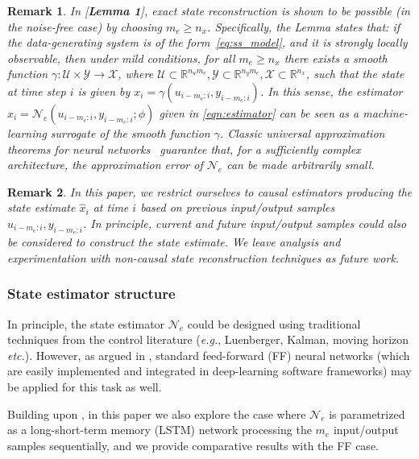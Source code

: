 \documentclass{article}
\newcommand{\NN}{\mathcal{N}} %
\newcommand{\seqlen}{m}
\newcommand{\nin}{{n_u}}
\newcommand{\ny}{{n_y}}
\newcommand{\nx}{{n_x}}
\newtheorem{remark}{Remark}
\begin{document}
\begin{remark} \label{rem:min_seq_est_len_1}
In \cite{verdult2004least}[\textbf{Lemma 1}], exact state reconstruction is shown to be possible (in the noise-free case) by choosing $\seqlen_e \geq \nx$.  Specifically, the Lemma states that: if the data-generating system is of the form~\eqref{eq:ss_model}, and it  is strongly locally observable, then under mild conditions, for all $\seqlen_e \geq \nx$ there exists a smooth function $\gamma: \mathcal{U} \times \mathcal{Y} \rightarrow \mathcal{X}$, where $\mathcal{U} \subset \mathbb{R}^{\nin \seqlen_e},  \mathcal{Y} \subset \mathbb{R}^{\ny \seqlen_e},  \mathcal{X} \subset \mathbb{R}^{\nx}$,  such that the state at time step $i$ is given by $ x_{i} = \gamma(u_{i-\seqlen_e:i}, y_{i-\seqlen_e:i})$. 
In this sense, the estimator  $x_{i} = \NN_e(u_{i-\seqlen_e:i}, y_{i-\seqlen_e:i}; \phi)$ given in \eqref{eqn:estimator} can be seen as a machine-learning surrogate of the smooth function
$\gamma$. Classic universal approximation theorems for neural networks~\cite{cybenko1989approximation} 
guarantee that, for a sufficiently complex architecture, the 
approximation error of $\NN_e$ can be made arbitrarily small.
\end{remark}

\begin{remark}
In this paper, we restrict ourselves to \emph{causal} estimators producing the state estimate 
$\hat x_i$ at time $i$ based on \emph{previous} input/output samples $u_{i-\seqlen_e:i}, y_{i-\seqlen_e:i}$. In principle, current and future input/output samples could also be considered to construct the state estimate. We leave analysis and experimentation with non-causal state reconstruction techniques as future work.
\end{remark}


\subsubsection{State estimator structure}
\label{subsubsec:state_estimation_structure}
In principle, the state estimator $\NN_e$ could be designed using traditional techniques from the control literature \cite{simon2006optimal} (\emph{e.g.}, Luenberger, Kalman, moving horizon \emph{etc.}). However, as argued in \cite{beintema2021nonlinear}, standard feed-forward (FF) neural networks (which are  easily implemented and integrated in deep-learning software frameworks) may be applied for this task as well.

Building upon \cite{beintema2021nonlinear}, in this paper we also explore the case where $\NN_e$ is parametrized as a long-short-term memory (LSTM) network  processing the 
$m_e$ input/output samples sequentially, and we provide comparative results with the FF case. 
\end{document}
